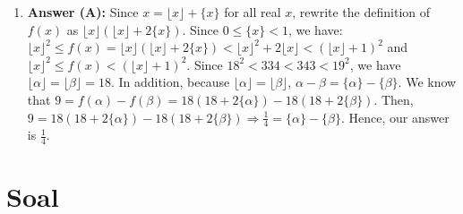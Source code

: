 \documentclass[12pt]{scrartcl}
\begin{document}
\begin{enumerate}
\item \textbf{Answer (A):} Since $x=\lfloor x\rfloor+\{x\}$ for all real $x$, rewrite the definition of $f(x)$ as $\lfloor x\rfloor(\lfloor x\rfloor+2\{x\})$. Since $0\le\{x\}<1$, we have: $\lfloor x\rfloor^{2}\le f(x)=\lfloor x\rfloor(\lfloor x\rfloor+2\{x\})<\lfloor x\rfloor^{2}+2\lfloor x\rfloor<(\lfloor x\rfloor+1)^{2}$ and $\lfloor x\rfloor^{2}\le f(x)<(\lfloor x\rfloor+1)^{2}$. Since $18^{2}<334<343<19^{2}$, we have $\lfloor\alpha\rfloor=\lfloor\beta\rfloor=18$. In addition, because $\lfloor\alpha\rfloor=\lfloor\beta\rfloor$, $\alpha-\beta=\{\alpha\}-\{\beta\}$. We know that $9=f(\alpha)-f(\beta)=18(18+2\{\alpha\})-18(18+2\{\beta\})$. Then, $9=18(18+2\{\alpha\})-18(18+2\{\beta\})\Rightarrow\frac{1}{4}=\{\alpha\}-\{\beta\}$. Hence, our answer is $\frac{1}{4}$.
\end{enumerate}


\section*{Soal}
\end{document}
